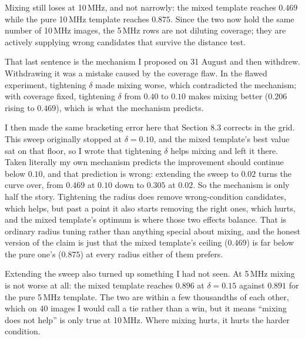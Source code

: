 \documentclass[11pt,a4paper]{article}
\begin{document}
\begin{table}[h]
  \centering
  \small
  
  \caption{Mixing with equal per-condition coverage. The mixed template has twice the rows
  of the pure ones, so each is swept over $\delta$ rather than compared at a single value.}
  \label{tab:mix2}
\end{table}

Mixing still loses at 10\,MHz, and not narrowly: the mixed template reaches $0.469$ while
the pure 10\,MHz template reaches $0.875$. Since the two now hold the same number of
10\,MHz images, the 5\,MHz rows are not diluting coverage; they are actively supplying
wrong candidates that survive the distance test.

That last sentence is the mechanism I proposed on 31 August and then withdrew. Withdrawing
it was a mistake caused by the coverage flaw. In the flawed experiment, tightening $\delta$
made mixing worse, which contradicted the mechanism; with coverage fixed, tightening
$\delta$ from $0.40$ to $0.10$ makes mixing better ($0.206$ rising to $0.469$), which is
what the mechanism predicts.

I then made the same bracketing error here that Section 8.3 corrects in the grid. This
sweep originally stopped at $\delta = 0.10$, and the mixed template's best value sat on
that floor, so I wrote that tightening $\delta$ helps mixing and left it there. Taken
literally my own mechanism predicts the improvement should continue below $0.10$, and that
prediction is wrong: extending the sweep to $0.02$ turns the curve over, from $0.469$ at
$0.10$ down to $0.305$ at $0.02$. So the mechanism is only half the story. Tightening the
radius does remove wrong-condition candidates, which helps, but past a point it also starts
removing the right ones, which hurts, and the mixed template's optimum is where those two
effects balance. That is ordinary radius tuning rather than anything special about mixing,
and the honest version of the claim is just that the mixed template's ceiling ($0.469$) is
far below the pure one's ($0.875$) at every radius either of them prefers.

Extending the sweep also turned up something I had not seen. At 5\,MHz mixing is not worse
at all: the mixed template reaches $0.896$ at $\delta = 0.15$ against $0.891$ for the pure
5\,MHz template. The two are within a few thousandths of each other, which on 40 images I
would call a tie rather than a win, but it means ``mixing does not help'' is only true at
10\,MHz. Where mixing hurts, it hurts the harder condition.
\end{document}
